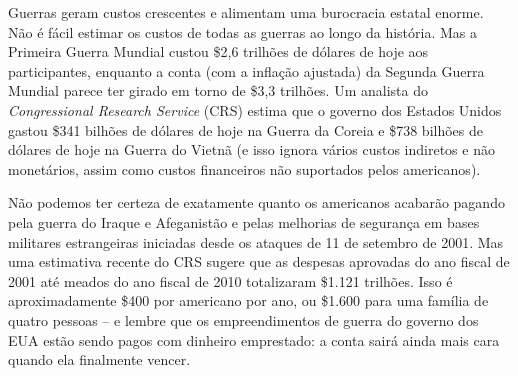 Guerras geram custos crescentes e alimentam uma burocracia estatal enorme. Não é fácil estimar os custos de todas as guerras ao longo da história. Mas a Primeira Guerra Mundial custou \$2,6 trilhões de dólares de hoje aos participantes, enquanto a conta (com a inflação ajustada) da Segunda Guerra Mundial parece ter girado em torno de \$3,3 trilhões. Um analista do \emph{Congressional Research Service} (CRS) estima que o governo dos Estados Unidos gastou \$341 bilhões de dólares de hoje na Guerra da Coreia e \$738 bilhões de dólares de hoje na Guerra do Vietnã (e isso ignora vários custos indiretos e não monetários, assim como custos financeiros não suportados pelos americanos).

Não podemos ter certeza de exatamente quanto os americanos acabarão pagando pela guerra do Iraque e Afeganistão e pelas melhorias de segurança em bases militares estrangeiras iniciadas desde os ataques de 11 de setembro de 2001. Mas uma estimativa recente do CRS sugere que as despesas aprovadas do ano fiscal de 2001 até meados do ano fiscal de 2010 totalizaram \$1.121 trilhões. Isso é aproximadamente \$400 por americano por ano, ou \$1.600 para uma família de quatro pessoas -- e lembre que os empreendimentos de guerra do governo dos EUA estão sendo pagos com dinheiro emprestado: a conta sairá ainda mais cara quando ela finalmente vencer.

